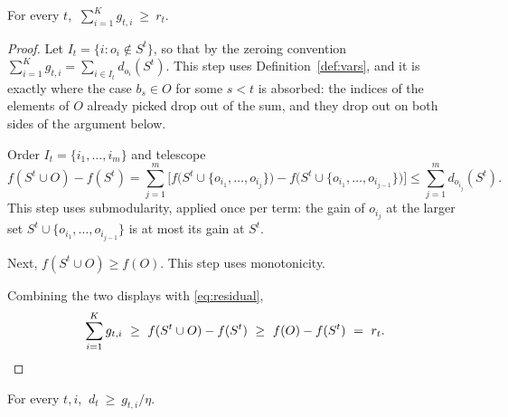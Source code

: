 \begin{lemma}
\label{lem:sum}
For every $t$, $\ \sum_{i=1}^{K} g_{t,i} \ \ge\ r_{t}$.
\end{lemma}

\begin{proof}
Let $I_{t} = \{ i : o_{i} \notin S^{t} \}$, so that by the zeroing convention
$\sum_{i=1}^{K} g_{t,i} = \sum_{i \in I_{t}} d_{o_{i}}(S^{t})$. This step uses
Definition~\ref{def:vars}, and it is exactly where the case $b_{s} \in O$ for
some $s < t$ is absorbed: the indices of the elements of $O$ already picked
drop out of the sum, and they drop out on both sides of the argument below.

Order $I_{t} = \{ i_{1}, \dots, i_{m} \}$ and telescope
\begin{equation*}
f(S^{t} \cup O) - f(S^{t})
= \sum_{j=1}^{m} \Big[ f\big(S^{t} \cup \{o_{i_{1}}, \dots, o_{i_{j}}\}\big)
 - f\big(S^{t} \cup \{o_{i_{1}}, \dots, o_{i_{j-1}}\}\big) \Big]
\le \sum_{j=1}^{m} d_{o_{i_{j}}}(S^{t}).
\end{equation*}
This step uses submodularity, applied once per term: the gain of $o_{i_{j}}$ at
the larger set $S^{t} \cup \{o_{i_{1}}, \dots, o_{i_{j-1}}\}$ is at most its
gain at $S^{t}$.

Next, $f(S^{t} \cup O) \ge f(O)$. This step uses monotonicity.

Combining the two displays with \eqref{eq:residual},
\begin{equation*}
\sum_{i=1}^{K} g_{t,i} \ \ge\ f(S^{t} \cup O) - f(S^{t})
\ \ge\ f(O) - f(S^{t}) \ =\ r_{t}.
\qedhere
\end{equation*}
\end{proof}

\begin{lemma}
\label{lem:pred}
For every $t, i$, $\ d_{t} \ \ge\ g_{t,i} / \eta$.
\end{lemma}

